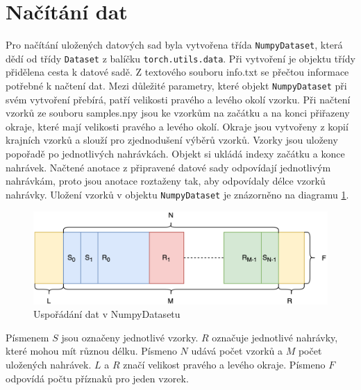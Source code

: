 \documentclass[FM,BP]{tulthesis}
\begin{document}
\section{Načítání dat} %
Pro načítání uložených datových sad byla vytvořena třída \texttt{\mbox{NumpyDataset}}, která dědí od třídy \texttt{\mbox{Dataset}} z balíčku \texttt{\mbox{torch.utils.data}}. Při vytvoření je objektu třídy přidělena cesta k datové sadě. Z textového souboru info.txt se přečtou informace potřebné k načtení dat. Mezi důležité parametry, které objekt \texttt{\mbox{NumpyDataset}} při svém vytvoření přebírá, patří velikosti pravého a levého okolí vzorku. Při načtení vzorků ze souboru samples.npy jsou ke vzorkům na začátku a na konci přiřazeny okraje, které mají velikosti pravého a levého okolí. Okraje jsou vytvořeny z kopií krajních vzorků a slouží pro zjednodušení výběrů vzorků. Vzorky jsou uloženy popořadě po jednotlivých nahrávkách. Objekt si ukládá indexy začátku a konce nahrávek. Načtené anotace z připravené datové sady odpovídají jednotlivým nahrávkám, proto jsou anotace roztaženy tak, aby odpovídaly délce vzorků nahrávky. Uložení vzorků v objektu \texttt{\mbox{NumpyDataset}} je znázorněno na diagramu \mbox{\ref{fig:data_arrangement}}.

\begin{figure}[htbp]
\centerline{\includegraphics[scale=.125]{dataset_arrangement.png}}
\caption{Uspořádání dat v NumpyDatasetu}
\label{fig:data_arrangement}
\end{figure}
\FloatBarrier

Písmenem $ S $ jsou označeny jednotlivé vzorky. $ R $ označuje jednotlivé nahrávky, které mohou mít různou délku. Písmeno $ N $ udává počet vzorků a $ M $ počet uložených nahrávek. $ L $ a $ R $ značí velikost pravého a levého okraje. Písmeno $ F $ odpovídá počtu příznaků pro jeden vzorek.
\end{document}
